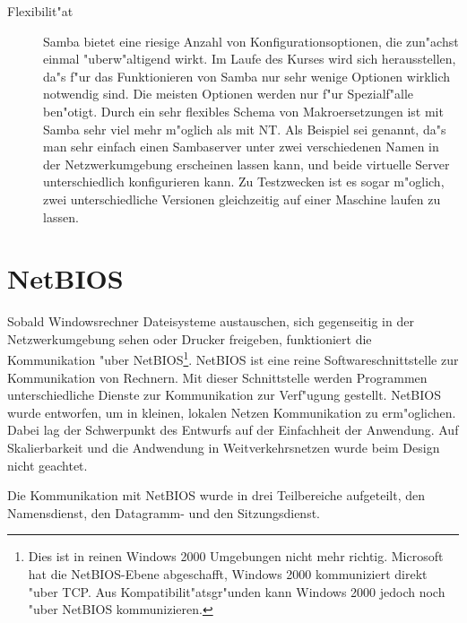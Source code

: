 \documentclass{scrartcl}
\begin{document}
\begin{description}
\item[Flexibilit"at] Samba bietet eine riesige Anzahl von
  Konfigurationsoptionen, die zun"achst einmal "uberw"altigend wirkt.
  Im Laufe des Kurses wird sich herausstellen, da"s f"ur das
  Funktionieren von Samba nur sehr wenige Optionen wirklich notwendig
  sind. Die meisten Optionen werden nur f"ur Spezialf"alle ben"otigt.
  Durch ein sehr flexibles Schema von Makroersetzungen ist mit Samba
  sehr viel mehr m"oglich als mit NT. Als Beispiel sei genannt, da"s
  man sehr einfach einen Sambaserver unter zwei verschiedenen Namen in
  der Netzwerkumgebung erscheinen lassen kann, und beide virtuelle
  Server unterschiedlich konfigurieren kann. Zu Testzwecken ist es 
  sogar m"oglich,
  zwei unterschiedliche Versionen gleichzeitig auf einer Maschine
  laufen zu lassen.

\end{description}

\section{NetBIOS}

Sobald Windowsrechner Dateisysteme austauschen, sich gegenseitig in
der Netzwerkumgebung sehen oder Drucker freigeben, funktioniert die
Kommunikation "uber NetBIOS\footnote{Dies ist in reinen Windows 2000
  Umgebungen nicht mehr richtig. Microsoft hat die NetBIOS-Ebene
  abgeschafft, Windows 2000 kommuniziert direkt "uber TCP. Aus
  Kompatibilit"atsgr"unden kann Windows 2000 jedoch noch "uber NetBIOS
  kommunizieren.}. NetBIOS ist eine reine
Softwareschnittstelle zur Kommunikation von Rechnern. Mit dieser
Schnittstelle werden Programmen unterschiedliche Dienste zur
Kommunikation zur Verf"ugung gestellt. NetBIOS wurde entworfen, um in
kleinen, lokalen Netzen Kommunikation zu erm"oglichen. Dabei lag der
Schwerpunkt des Entwurfs auf der Einfachheit der Anwendung. Auf
Skalierbarkeit und die Andwendung in Weitverkehrsnetzen wurde beim
Design nicht geachtet.

Die Kommunikation mit NetBIOS wurde in drei Teilbereiche aufgeteilt,
den Namensdienst, den Datagramm- und den Sitzungsdienst.
\end{document}
